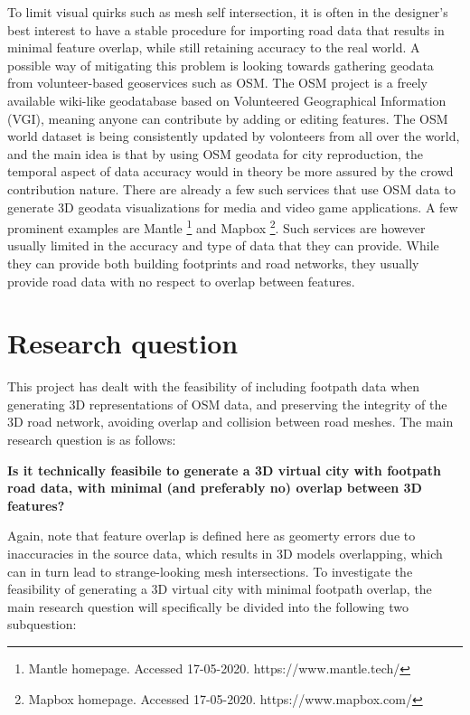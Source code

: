 \documentclass{kththesis}
\begin{document}
To limit visual quirks such as mesh self intersection, it is often in the designer's best interest to have a stable procedure for importing road data that results in minimal feature overlap, while still retaining accuracy to the real world.
A possible way of mitigating this problem is looking towards gathering geodata from volunteer-based geoservices such as OSM.
The OSM project is a freely available wiki-like geodatabase based on Volunteered Geographical Information (VGI), meaning anyone can contribute by adding or editing features.
The OSM world dataset is being consistently updated by volonteers from all over the world, and the main idea is that by using OSM geodata for city reproduction, the temporal aspect of data accuracy would in theory be more assured by the crowd contribution nature.
There are already a few such services that use OSM data to generate 3D geodata visualizations for media and video game applications.
A few prominent examples are Mantle
\footnote{Mantle homepage. Accessed 17-05-2020. https://www.mantle.tech/}
and Mapbox
\footnote{Mapbox homepage. Accessed 17-05-2020. https://www.mapbox.com/}.
Such services are however usually limited in the accuracy and type of data that they can provide.
While they can provide both building footprints and road networks, they usually provide road data with no respect to overlap between features.

\section{Research question}

This project has dealt with the feasibility of including footpath data when generating 3D representations of OSM data, and preserving the integrity of the 3D road network, avoiding overlap and collision between road meshes. The main research question is as follows:
\begin{center}
    \textbf{Is it technically feasibile to generate a 3D virtual city with footpath road data, with minimal (and preferably no) overlap between 3D features?}
\end{center}

Again, note that feature overlap is defined here as geomerty errors due to inaccuracies in the source data, which results in 3D models overlapping, which can in turn lead to strange-looking mesh intersections.
To investigate the feasibility of generating a 3D virtual city with minimal footpath overlap, the main research question will specifically be divided into the following two subquestion:
\end{document}
